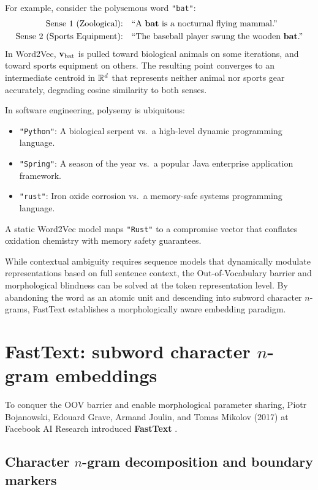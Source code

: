 \documentclass[../../main.tex]{subfiles}
\begin{document}
For example, consider the polysemous word \texttt{"bat"}:
\begin{align*}
\text{Sense 1 (Zoological):} \quad &\text{``A \textbf{bat} is a nocturnal flying mammal.''} \\
\text{Sense 2 (Sports Equipment):} \quad &\text{``The baseball player swung the wooden \textbf{bat}.''}
\end{align*}
In Word2Vec, $\mathbf{v}_{\text{bat}}$ is pulled toward biological animals on some iterations, and toward sports equipment on others. The resulting point converges to an intermediate centroid in $\mathbb{R}^d$ that represents neither animal nor sports gear accurately, degrading cosine similarity to both senses.

In software engineering, polysemy is ubiquitous:
\begin{itemize}
    \item \texttt{"Python"}: A biological serpent vs.~a high-level dynamic programming language.
    \item \texttt{"Spring"}: A season of the year vs.~a popular Java enterprise application framework.
    \item \texttt{"rust"}: Iron oxide corrosion vs.~a memory-safe systems programming language.
\end{itemize}
A static Word2Vec model maps \texttt{"Rust"} to a compromise vector that conflates oxidation chemistry with memory safety guarantees.

While contextual ambiguity requires sequence models that dynamically modulate representations based on full sentence context, the Out-of-Vocabulary barrier and morphological blindness can be solved at the token representation level. By abandoning the word as an atomic unit and descending into subword character $n$-grams, FastText establishes a morphologically aware embedding paradigm.

\section{FastText: subword character \texorpdfstring{$n$}{n}-gram embeddings}
\label{sec:fasttext_subwords}

To conquer the OOV barrier and enable morphological parameter sharing, Piotr Bojanowski, Edouard Grave, Armand Joulin, and Tomas Mikolov (2017) at Facebook AI Research introduced \textbf{FastText} \cite{bojanowski2017}.

\subsection{Character \texorpdfstring{$n$}{n}-gram decomposition and boundary markers}
\label{subsec:character_ngrams}
\end{document}
